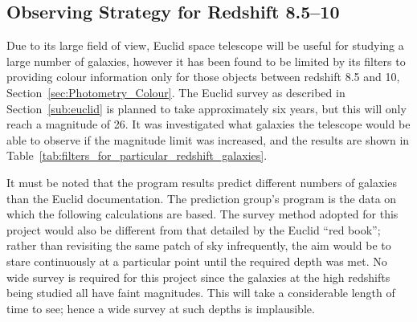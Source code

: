 
\subsection{Observing Strategy for Redshift 8.5--10} %
\label{sub:using_euclid_for_a_survey_of_edshift_8_54_to_10_1}
	Due to its large field of view, Euclid space telescope will be useful for studying a large number of galaxies, however it has been found to be limited by its filters to providing colour information only for those objects between redshift 8.5 and 10, Section~\ref{sec:Photometry_Colour}. The Euclid survey as described in Section~\ref{sub:euclid} is planned to take approximately six years, but this will only reach a magnitude of 26. It was investigated what galaxies the telescope would be able to observe if the magnitude limit was increased, and the results are shown in Table~\ref{tab:filters_for_particular_redshift_galaxies}.

	It must be noted that the program results predict different numbers of galaxies than the Euclid documentation. The prediction group's program is the data on which the following calculations are based. The survey method adopted for this project would also be different from that detailed by the Euclid ``red book''; rather than revisiting the same patch of sky infrequently, the aim would be to stare continuously at a particular point until the required depth was met. No wide survey is required for this project since the galaxies at the high redshifts being studied all have faint magnitudes. This will take a considerable length of time to see; hence a wide survey at such depths is implausible.

